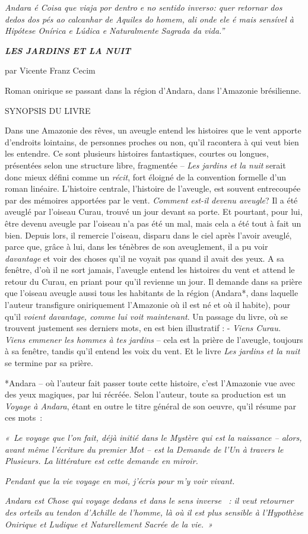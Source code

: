 \emph{Andara é Coisa que viaja por dentro e no sentido inverso: quer
retornar dos dedos dos pés ao calcanhar de Aquiles do homem, ali onde
ele é mais sensível à Hipótese Onírica e Lúdica e Naturalmente Sagrada
da vida.''}

\emph{\textbf{LES JARDINS ET LA NUIT}}

par Vicente Franz Cecim

Roman onirique se passant dans la région d'Andara, dans l'Amazonie
brésilienne.

SYNOPSIS DU LIVRE

Dans une Amazonie des rêves, un aveugle entend les histoires que le vent
apporte d'endroits lointains, de personnes proches ou non, qu'il
racontera à qui veut bien les entendre. Ce sont plusieurs histoires
fantastiques, courtes ou longues, présentées selon une structure libre,
fragmentée -- \emph{Les jardins et la nuit} serait donc mieux défini
comme un \emph{récit}, fort éloigné de la convention formelle d'un roman
linéaire. L'histoire centrale, l'histoire de l'aveugle, est souvent
entrecoupée par des mémoires apportées par le vent. \emph{Comment est-il
devenu aveugle}? Il a été aveuglé par l'oiseau Curau, trouvé un jour
devant sa porte. Et pourtant, pour lui, être devenu aveugle par l'oiseau
n'a pas été un mal, mais cela a été tout à fait un bien. Depuis lors, il
remercie l'oiseau, disparu dans le ciel après l'avoir aveuglé, parce
que, grâce à lui, dans les ténèbres de son aveuglement, il a pu voir
\emph{davantage} et voir des choses qu'il ne voyait pas quand il avait
des yeux. A sa fenêtre, d'où il ne sort jamais, l'aveugle entend les
histoires du vent et attend le retour du Curau, en priant pour qu'il
revienne un jour. Il demande dans sa prière que l'oiseau aveugle aussi
tous les habitants de la région (Andara*, dans laquelle l'auteur
transfigure oniriquement l'Amazonie où il est né et où il habite), pour
qu'il \emph{voient davantage, comme lui voit maintenant}. Un passage du
livre, où se trouvent justement ses derniers mots, en est bien
illustratif : - \emph{Viens Curau. Viens emmener les hommes à tes
jardins} -- cela est la prière de l'aveugle, toujours à sa fenêtre,
tandis qu'il entend les voix du vent. Et le livre \emph{Les jardins et
la nuit} se termine par sa prière.

*Andara -- où l'auteur fait passer toute cette histoire, c'est
l'Amazonie vue avec des yeux magiques, par lui récréée. Selon l'auteur,
toute sa production est un \emph{Voyage à Andara}, étant en outre le
titre général de son oeuvre, qu'il résume par ces mots~:

\emph{«~Le voyage que l'on fait, déjà initié dans le Mystère qui est la
naissance -- alors, avant même l'écriture du premier Mot -- est la
Demande de l'Un à travers le Plusieurs. La littérature est cette demande
en miroir.}

\emph{Pendant que la vie voyage en moi, j'écris pour m'y voir vivant.}

\emph{Andara est Chose qui voyage dedans et dans le sens inverse ~: il
veut retourner des orteils au tendon d'Achille de l'homme, là où il est
plus sensible à l'Hypothèse Onirique et Ludique et Naturellement Sacrée
de la vie.~»}
